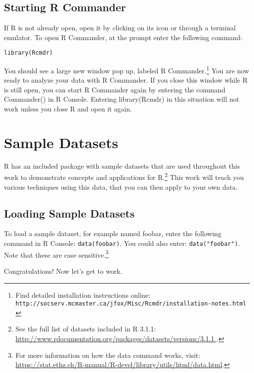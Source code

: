 \subsection{Starting R Commander}
If R is not already open, open it by clicking on its icon or through a 
terminal emulator. To open R Commander, at the prompt enter the following 
command:

\texttt{library(Rcmdr)}

You should see a large new window pop up, labeled R Commander.\footnote{Find 
detailed installation instructions online: \texttt{http://socserv.mcmaster.ca/jfox/Misc/Rcmdr/installation-notes.html
}} You are now ready to analyze your data with R Commander. If you close this 
window while R is still open, you can start R Commander again by entering the 
command Commander() in R Console. Entering library(Rcmdr) in this situation 
will not work unless you close R and open it again.

\section{Sample Datasets}
R has an included package with sample datasets that are used throughout this 
work to demonstrate concepts and applications for R.\footnote{See the full list
 of datasets included in R 3.1.1: \url{http://www.rdocumentation.org/packages/datasets/versions/3.1.1
}.} This work will teach you various techniques using this data, that you can 
then apply to your own data.

\subsection{Loading Sample Datasets}
To load a sample dataset, for example named foobar, enter the following command
 in R Console: \texttt{data(foobar)}. You could also enter: 
\texttt{data("foobar")}. Note that these are case sensitive.\footnote{For more 
information on how the data command works, visit: \url{https://stat.ethz.ch/R-manual/R-devel/library/utils/html/data.html}.}

Congratulations! Now let's get to work.
